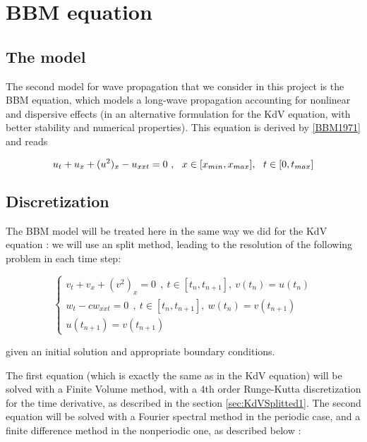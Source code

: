 \section{BBM equation}
\label{sec:BBM}

\subsection{The model}

\indent The second model for wave propagation that we consider in this project is the BBM equation, which models a long-wave propagation accounting for nonlinear and dispersive effects (in an alternative formulation for the KdV equation, with better stability and numerical properties). This equation is derived by \ref{BBM1971} and reads

\begin{equation}
    u_t + u_x + (u^2)_x - u_{xxt} = 0 \ , \ \ x \in [x_{min},x_{max}], \ \ t \in [0, t_{max}] \\
\end{equation}

\subsection{Discretization}

\indent The BBM model will be treated here in the same way we did for the KdV equation : we will use an split method, leading to the resolution of the following problem in each time step: 

\begin{equation}
\begin{cases}
    v_t + v_x + (v^2)_x = 0 \ \ ,\ t \in [t_n,t_{n+1}], \  v(t_n) = u(t_n) \\
    w_t - cw_{xxt} = 0 \ \ , \ t \in [t_n,t_{n+1}], \  w(t_n) = v(t_{n+1}) \\
    u(t_{n+1}) = v(t_{n+1})
\end{cases}
\end{equation}

\noindent given an initial solution and appropriate boundary conditions.

\indent The first equation (which is exactly the same as in the KdV equation) will be solved with a Finite Volume method, with a 4th order Runge-Kutta discretization for the time derivative, as described in the section \ref{sec:KdVSplitted1}.  The second equation will be solved with a Fourier spectral method in the periodic case, and a finite difference method in the nonperiodic one, as described below :

